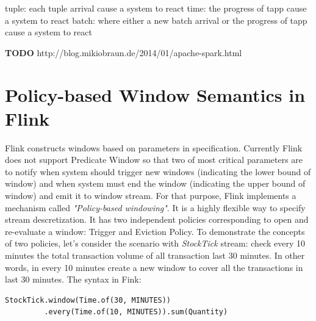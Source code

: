 tuple: each tuple arrival cause a system to react
time: the progress of tapp cause a system to react
batch:  where either a new batch arrival or the progress of tapp cause a system to react


\textbf{TODO} http://blog.mikiobraun.de/2014/01/apache-spark.html


\section{Policy-based Window Semantics in Flink}


Flink constructs windows based on parameters in specification. Currently Flink does not support Predicate Window so that two of most critical parameters are to notify when system should trigger new windows (indicating the lower bound of window) and when system must end the window (indicating the upper bound of window) and emit it to window stream. For that purpose, Flink implements a mechanism called \textit{"Policy-based windowing"}. It is a highly flexible way to specify stream descretization. It has two independent policies corresponding to open and re-evaluate a window: Trigger and Eviction Policy.
To demonstrate the concepts of two policies, let's consider the scenario with \textit{StockTick} stream: check every 10 minutes the total transaction volume of all transaction last 30 minutes. In other words, in every 10 minutes create a new window to cover all the transactions in last 30 minutes. The syntax in Fink:

\begin{verbatim}
StockTick.window(Time.of(30, MINUTES))
		 .every(Time.of(10, MINUTES)).sum(Quantity)
\end{verbatim}

